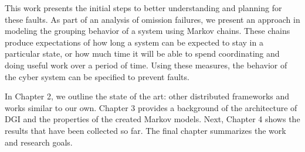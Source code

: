 This work presents the initial steps to better understanding and planning for these faults. As part of an analysis of omission failures, we present an approach in modeling the grouping behavior of a system using Markov chains. These chains produce expectations of how long a system can be expected to stay in a particular state, or how much time it will be able to spend coordinating and doing useful work over a period of time. Using these measures, the behavior of the cyber system can be specified to prevent faults.

In Chapter 2, we outline the state of the art: other distributed frameworks and works similar to our own. Chapter 3 provides a background of the architecture of DGI and the properties of the created Markov models. Next, Chapter 4 shows the results that have been collected so far. The final chapter summarizes the work and research goals.
